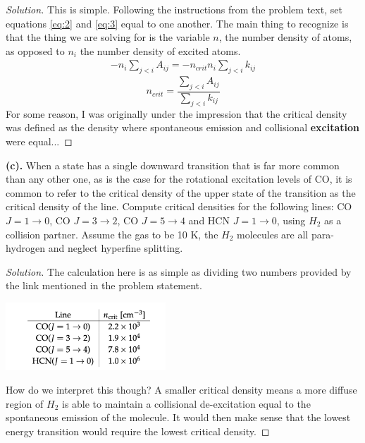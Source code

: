 \documentclass[10pt]{article}
\begin{document}
\begin{proof}[Solution]
\noindent This is simple. Following the instructions from the problem text, set equations \eqref{eq:2} and \eqref{eq:3} equal to one another. The main thing to recognize is that the thing we are solving for is the variable $n$, the number density of atoms, as opposed to $n_{i}$ the number density of excited atoms.
\begin{align*}
-n_{i}\sum_{j < i}A_{ij} = -n_{crit}n_{i}\sum_{j < i}k_{ij} 
\end{align*}
\begin{equation}
\label{eq:4}
n_{crit} = \frac{\sum_{j<i} A_{ij}}{\sum_{j<i} k_{ij}}
\end{equation}
For some reason, I was originally under the impression that the critical density was defined as the density where spontaneous emission and collisional \textbf{excitation} were equal...
\end{proof}

\noindent\textbf{(c).} When a state has a single downward transition that is far more common than any other one, as is the case for the rotational excitation levels of CO, it is common to refer to the critical density of the upper state of the transition as the critical density of the line. Compute critical densities for the following lines: CO $J = 1 \rightarrow 0$, CO $J = 3 \rightarrow 2$, CO $J = 5 \rightarrow 4$ and HCN $J = 1 \rightarrow 0$, using $H_{2}$ as a collision partner. Assume the gas to be 10 K, the $H_{2}$ molecules are all para-hydrogen and neglect hyperfine splitting.
\begin{proof}[Solution]
The calculation here is as simple as dividing two numbers provided by the link mentioned in the problem statement.\newline
\begin{center}
\includegraphics[width=6cm]{./figures/critical_density.png}
\end{center}
How do we interpret this though? A smaller critical density means a more diffuse region of $H_{2}$ is able to maintain a collisional de-excitation equal to the spontaneous emission of the molecule. It would then make sense that the lowest energy transition would require the lowest critical density.
\end{proof}
\end{document}
